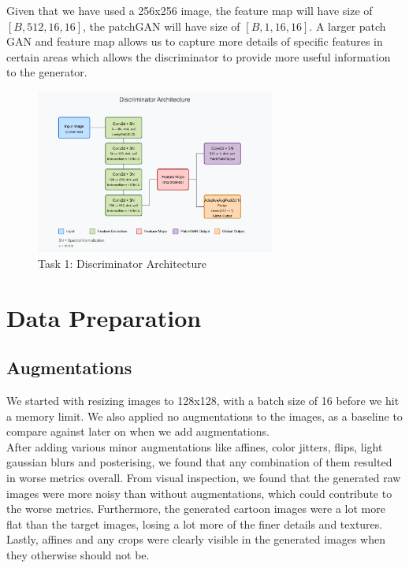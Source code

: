 \documentclass[twoside,english,notitlepage]{report}
\begin{document}
\noindent Given that we have used a 256x256 image, the feature map will have size of $[B, 512, 16, 16]$, the patchGAN will have size of $[B, 1, 16, 16]$. A larger patch GAN and feature map allows us to capture more details of specific features in certain areas which allows the discriminator to provide more useful information to the generator.


\begin{figure}[h]
    \centering
    \includegraphics[width=0.7\textwidth]{task1/discriminator-architecture.pdf}
    \caption{Task 1: Discriminator Architecture}
\end{figure}


\section{Data Preparation}
\subsection{Augmentations}
We started with resizing images to 128x128, with a batch size of 16 before we hit a memory limit. We also applied no augmentations to the images, as a baseline to compare against later on when we add augmentations. \\

\noindent After adding various minor augmentations like affines, color jitters, flips, light gaussian blurs and posterising, we found that any combination of them resulted in worse metrics overall. From visual inspection, we found that the generated raw images were more noisy than without augmentations, which could contribute to the worse metrics. Furthermore, the generated cartoon images were a lot more flat than the target images, losing a lot more of the finer details and textures. Lastly, affines and any crops were clearly visible in the generated images when they otherwise should not be. \\
\end{document}
